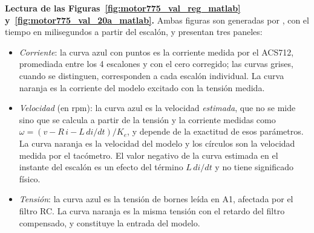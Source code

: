 \textbf{Lectura de las Figuras~\ref{fig:motor775_val_reg_matlab} y~\ref{fig:motor775_val_20a_matlab}.} Ambas figuras son generadas por , con el tiempo en milisegundos a partir del escalón, y presentan tres paneles:
\begin{itemize}
\item \emph{Corriente}: la curva azul con puntos es la corriente medida por el ACS712, promediada entre los 4 escalones y con el cero corregido; las curvas grises, cuando se distinguen, corresponden a cada escalón individual. La curva naranja es la corriente del modelo excitado con la tensión medida.
\item \emph{Velocidad} (en rpm): la curva azul es la velocidad \emph{estimada}, que no se mide sino que se calcula a partir de la tensión y la corriente medidas como $\omega = (v - R\,i - L\,di/dt)/K_e$, y depende de la exactitud de esos parámetros. La curva naranja es la velocidad del modelo y los círculos son la velocidad medida por el tacómetro. El valor negativo de la curva estimada en el instante del escalón es un efecto del término $L\,di/dt$ y no tiene significado físico.
\item \emph{Tensión}: la curva azul es la tensión de bornes leída en A1, afectada por el filtro RC. La curva naranja es la misma tensión con el retardo del filtro compensado, y constituye la entrada del modelo.
\end{itemize}

